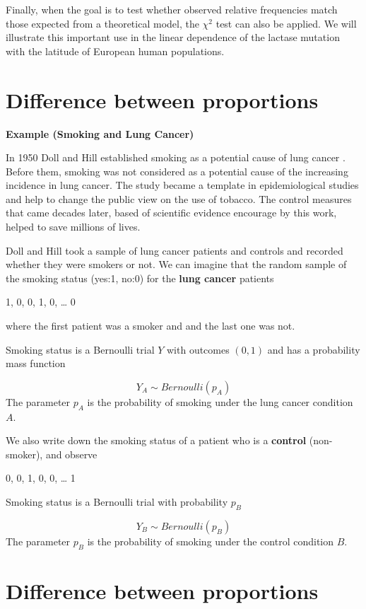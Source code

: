 \documentclass[
]{book}
\begin{document}
Finally, when the goal is to test whether observed relative frequencies match those expected from a theoretical model, the \(\chi^2\) test can also be applied. We will illustrate this important use in the linear dependence of the lactase mutation with the latitude of European human populations.

\hypertarget{difference-between-proportions}{%
\section{Difference between proportions}\label{difference-between-proportions}}

\textbf{Example (Smoking and Lung Cancer)}

In 1950 Doll and Hill established smoking as a potential cause of lung cancer \citep{doll1950smoking}. Before them, smoking was not considered as a potential cause of the increasing incidence in lung cancer. The study became a template in epidemiological studies and help to change the public view on the use of tobacco. The control measures that came decades later, based of scientific evidence encourage by this work, helped to save millions of lives.

Doll and Hill took a sample of lung cancer patients and controls and recorded whether they were smokers or not. We can imagine that the random sample of the smoking status (yes:1, no:0) for the \textbf{lung cancer} patients

1, 0, 0, 1, 0, \ldots{} 0

where the first patient was a smoker and and the last one was not.

Smoking status is a Bernoulli trial \(Y\) with outcomes \((0, 1)\) and has a probability mass function

\[Y_A \sim Bernoulli (p_A)\]
The parameter \(p_A\) is the probability of smoking under the lung cancer condition \(A\).

We also write down the smoking status of a patient who is a \textbf{control} (non-smoker), and observe

0, 0, 1, 0, 0, \ldots{} 1

Smoking status is a Bernoulli trial with probability \(p_B\)

\[Y_B \sim Bernoulli (p_B)\]
The parameter \(p_B\) is the probability of smoking under the control condition \(B\).

\hypertarget{difference-between-proportions-1}{%
\section{Difference between proportions}\label{difference-between-proportions-1}}
\end{document}
